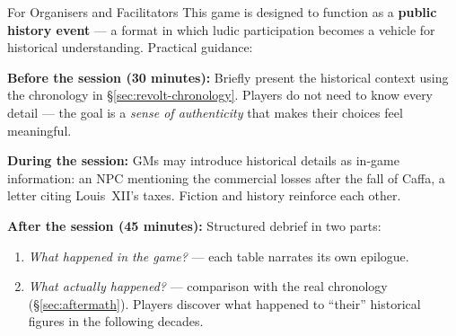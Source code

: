 \begin{rulebox}[GoldRPG]{For Organisers and Facilitators}
This game is designed to function as a \textbf{public history event} ---
a format in which ludic participation becomes a vehicle for historical
understanding. Practical guidance:

\medskip
\textbf{Before the session (30 minutes):}
Briefly present the historical context using the chronology in
\S\ref{sec:revolt-chronology}. Players do not need to know every detail
--- the goal is a \textit{sense of authenticity} that makes their choices
feel meaningful.

\medskip
\textbf{During the session:}
GMs may introduce historical details as in-game information: an NPC
mentioning the commercial losses after the fall of Caffa, a letter citing
Louis~XII's taxes. Fiction and history reinforce each other.

\medskip
\textbf{After the session (45 minutes):}
Structured debrief in two parts:
\begin{enumerate}
  \item \textit{What happened in the game?} --- each table narrates
        its own epilogue.
  \item \textit{What actually happened?} --- comparison with the real
        chronology (\S\ref{sec:aftermath}). Players discover what happened
        to ``their'' historical figures in the following decades.
\end{enumerate}

\end{rulebox}
